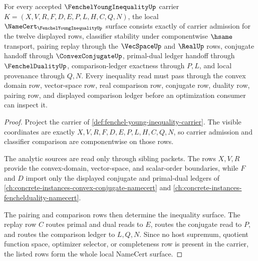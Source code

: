 \begin{theorem}\label{thm:fenchel-young-inequality-namecert-obligations}
For every accepted $\FenchelYoungInequalityUp$ carrier $K=(X,V,R,F,D,E,P,L,H,C,Q,N)$, the local $\NameCert_{\FenchelYoungInequalityUp}$ surface consists exactly of carrier admission for the twelve displayed rows, classifier stability under componentwise $\hsame$ transport, pairing replay through the $\VecSpaceUp$ and $\RealUp$ rows, conjugate handoff through $\ConvexConjugateUp$, primal-dual ledger handoff through $\FenchelDualityUp$, comparison-ledger exactness through $P,L$, and local provenance through $Q,N$. Every inequality read must pass through the convex domain row, vector-space row, real comparison row, conjugate row, duality row, pairing row, and displayed comparison ledger before an optimization consumer can inspect it.
\end{theorem}
\begin{proof}
Project the carrier of \autoref{def:fenchel-young-inequality-carrier}. The visible coordinates are exactly $X,V,R,F,D,E,P,L,H,C,Q,N$, so carrier admission and classifier comparison are componentwise on those rows.

The analytic sources are read only through sibling packets. The rows $X,V,R$ provide the convex-domain, vector-space, and scalar-order boundaries, while $F$ and $D$ import only the displayed conjugate and primal-dual ledgers of \autoref{ch:concrete-instances-convex-conjugate-namecert} and \autoref{ch:concrete-instances-fenchelduality-namecert}.

The pairing and comparison rows then determine the inequality surface. The replay row $C$ routes primal and dual reads to $E$, routes the conjugate read to $P$, and routes the comparison ledger to $L,Q,N$. Since no host supremum, quotient function space, optimizer selector, or completeness row is present in the carrier, the listed rows form the whole local NameCert surface.
\end{proof}


